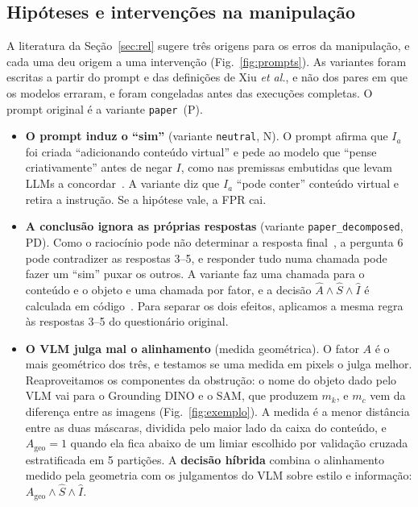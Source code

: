 \documentclass[conference]{IEEEtran}
\newcommand{\Ia}{I_a}
\newcommand{\Ageo}{A_{\mathrm{geo}}}
\newcommand{\var}[1]{\texttt{#1}}
\newcommand{\vpaper}{\var{paper}}
\newcommand{\vneutral}{\var{neutral}}
\newcommand{\vpd}{\var{paper\_\allowbreak decomposed}}
\begin{document}
\subsection{Hipóteses e intervenções na manipulação}
\label{sec:hipoteses}
A literatura da Seção~\ref{sec:rel} sugere três origens para os erros da manipulação, e cada uma deu
origem a uma intervenção (Fig.~\ref{fig:prompts}). As variantes foram escritas a partir do prompt e das
definições de Xiu \emph{et al.}, e não dos pares em que os modelos erraram, e foram congeladas antes das
execuções completas. O prompt original é a variante \vpaper\ (P).
\begin{itemize}
\item \textbf{O prompt induz o ``sim''} (variante \vneutral, N). O prompt afirma que $\Ia$ foi criada
  ``adicionando conteúdo virtual'' e pede ao modelo que ``pense criativamente'' antes de negar $I$, como
  nas premissas embutidas que levam LLMs a concordar~\cite{sharma2024,pope}. A variante diz que $\Ia$
  ``pode conter'' conteúdo virtual e retira a instrução. Se a hipótese vale, a FPR cai.
\item \textbf{A conclusão ignora as próprias respostas} (variante \vpd, PD). Como o raciocínio pode não
  determinar a resposta final~\cite{turpin2023}, a pergunta 6 pode contradizer as respostas 3--5, e
  responder tudo numa chamada pode fazer um ``sim'' puxar os outros. A variante faz uma chamada para o
  conteúdo e o objeto e uma chamada por fator, e a decisão $\hat A\wedge\hat S\wedge\hat I$ é calculada
  em código~\cite{khot2023}. Para separar os dois efeitos, aplicamos a mesma regra às respostas 3--5 do
  questionário original.
\item \textbf{O VLM julga mal o alinhamento} (medida geométrica). O fator $A$ é o mais geométrico dos
  três, e testamos se uma medida em pixels o julga melhor. Reaproveitamos os componentes da obstrução: o
  nome do objeto dado pelo VLM vai para o Grounding DINO e o SAM, que produzem $m_k$, e $m_c$ vem da
  diferença entre as imagens (Fig.~\ref{fig:exemplo}). A medida é a menor distância entre as duas
  máscaras, dividida pelo maior lado da caixa do conteúdo, e $\Ageo=1$ quando ela fica abaixo de um
  limiar escolhido por validação cruzada estratificada em 5 partições. A \textbf{decisão híbrida} combina
  o alinhamento medido pela geometria com os julgamentos do VLM sobre estilo e informação:
  $\Ageo\wedge\hat S\wedge\hat I$.
\end{itemize}
\end{document}
